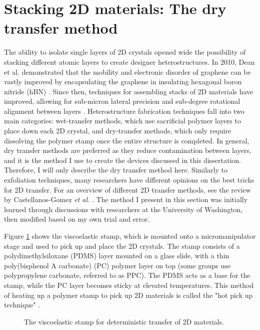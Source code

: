 \documentclass[double,12pt,1in]{beavtex}
\begin{document}
\section{Stacking 2D materials: The dry transfer method}
The ability to isolate single layers of 2D crystals opened wide the possibility of stacking different atomic layers to create designer heterostructures. In 2010, Dean et al. demonstrated that the mobility and electronic disorder of graphene can be vastly improved by encapsulating the graphene in insulating hexagonal boron nitride (hBN) \cite{dean_boron_2010}. Since then, techniques for assembling stacks of 2D materials have improved, allowing for sub-micron lateral precision and sub-degree rotational alignment between layers \cite{castellanos-gomez_van_2022}. Heterostructure fabrication techniques fall into two main categories: wet-transfer methods, which use sacrificial polymer layers to place down each 2D crystal, and dry-transfer methods, which only require dissolving the polymer stamp once the entire structure is completed. In general, dry transfer methods are preferred as they reduce contamination between layers, and it is the method I use to create the devices discussed in this dissertation. Therefore, I will only describe the dry transfer method here. Similarly to exfoliation techniques, many researchers have different opinions on the best tricks for 2D transfer. For an overview of different 2D transfer methods, see the review by Castellanos-Gomez \textit{et al.} \cite{castellanos-gomez_van_2022}. The method I present in this section was initially learned through discussions with researchers at the University of Washington, then modified based on my own trial and error.

Figure \ref{stamp diagram} shows the viscoelastic stamp, which is mounted onto a micromanipulator stage and used to pick up and place the 2D crystals. The stamp consists of a polydimethylsiloxane (PDMS) layer mounted on a glass slide, with a thin poly(bisphenol A carbonate) (PC) polymer layer on top (some groups use polypropylene carbonate, referred to as PPC). The PDMS acts as a base for the stamp, while the PC layer becomes sticky at elevated temperatures. This method of heating up a polymer stamp to pick up 2D materials is called the "hot pick up technique" \cite{pizzocchero_hot_2016}.


\begin{figure}
    \caption{The viscoelastic stamp for deterministic transfer of 2D materials.}
    \label{stamp diagram}
\end{figure}
\end{document}
